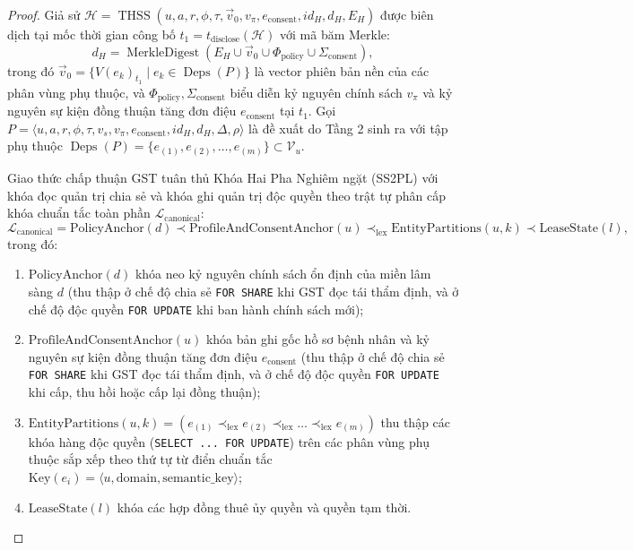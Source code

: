 \documentclass[11pt]{article}
\begin{document}
\begin{proof}
Giả sử $\mathcal{H} = \operatorname{THSS}(u, a, r, \phi, \tau, \vec{v}_0, v_{\pi}, e_{\text{consent}}, id_H, d_H, E_H)$ được biên dịch tại mốc thời gian công bố $t_1 = t_{\text{disclose}}(\mathcal{H})$ với mã băm Merkle:
\begin{equation*}
d_H = \operatorname{MerkleDigest}(E_H \cup \vec{v}_0 \cup \Phi_{\text{policy}} \cup \Sigma_{\text{consent}}),
\end{equation*}
trong đó $\vec{v}_0 = \{ V(e_k)_{t_1} \mid e_k \in \operatorname{Deps}(P) \}$ là vector phiên bản nền của các phân vùng phụ thuộc, và $\Phi_{\text{policy}}, \Sigma_{\text{consent}}$ biểu diễn kỷ nguyên chính sách $v_{\pi}$ và kỷ nguyên sự kiện đồng thuận tăng đơn điệu $e_{\text{consent}}$ tại $t_1$.
Gọi $P = \langle u, a, r, \phi, \tau, v_s, v_{\pi}, e_{\text{consent}}, id_H, d_H, \Delta, \rho \rangle$ là đề xuất do Tầng 2 sinh ra với tập phụ thuộc $\operatorname{Deps}(P) = \{e_{(1)}, e_{(2)}, \dots, e_{(m)}\} \subset \mathcal{V}_u$.

Giao thức chấp thuận GST tuân thủ Khóa Hai Pha Nghiêm ngặt (SS2PL) với khóa đọc quản trị chia sẻ và khóa ghi quản trị độc quyền theo trật tự phân cấp khóa chuẩn tắc toàn phần $\mathcal{L}_{\text{canonical}}$:
\begin{equation}
\mathcal{L}_{\text{canonical}} = \text{PolicyAnchor}(d) \prec \text{ProfileAndConsentAnchor}(u) \prec_{\text{lex}} \text{EntityPartitions}(u, k) \prec \text{LeaseState}(l),
\label{eq:proof_canonical_lock_hierarchy_vi}
\end{equation}
trong đó:
\begin{enumerate}
    \item $\text{PolicyAnchor}(d)$ khóa neo kỷ nguyên chính sách ổn định của miền lâm sàng $d$ (thu thập ở chế độ chia sẻ \texttt{FOR SHARE} khi GST đọc tái thẩm định, và ở chế độ độc quyền \texttt{FOR UPDATE} khi ban hành chính sách mới);
    \item $\text{ProfileAndConsentAnchor}(u)$ khóa bản ghi gốc hồ sơ bệnh nhân và kỷ nguyên sự kiện đồng thuận tăng đơn điệu $e_{\text{consent}}$ (thu thập ở chế độ chia sẻ \texttt{FOR SHARE} khi GST đọc tái thẩm định, và ở chế độ độc quyền \texttt{FOR UPDATE} khi cấp, thu hồi hoặc cấp lại đồng thuận);
    \item $\text{EntityPartitions}(u, k) = \left( e_{(1)} \prec_{\text{lex}} e_{(2)} \prec_{\text{lex}} \dots \prec_{\text{lex}} e_{(m)} \right)$ thu thập các khóa hàng độc quyền (\texttt{SELECT ... FOR UPDATE}) trên các phân vùng phụ thuộc sắp xếp theo thứ tự từ điển chuẩn tắc $\text{Key}(e_i) = \langle u, \text{domain}, \text{semantic\_key} \rangle$;
    \item $\text{LeaseState}(l)$ khóa các hợp đồng thuê ủy quyền và quyền tạm thời.
\end{enumerate}


\end{proof}
\end{document}
